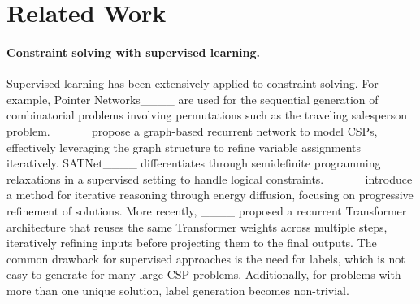 \section{Related Work}
\paragraph{Constraint solving with supervised learning.}
Supervised learning has been extensively applied to constraint solving. For example, Pointer Networks____ are used for the sequential generation of combinatorial problems involving permutations such as the traveling salesperson problem. ____ propose a graph-based recurrent network to model CSPs, effectively leveraging the graph structure to refine variable assignments iteratively. SATNet____ differentiates through semidefinite programming relaxations in a supervised setting to handle logical constraints. ____ introduce a method for iterative reasoning through energy diffusion, focusing on progressive refinement of solutions. More recently, ____ proposed a recurrent Transformer architecture that reuses the same Transformer weights across multiple steps, iteratively refining inputs before projecting them to the final outputs. The common drawback for supervised approaches is the need for labels, which is not easy to generate for many large CSP problems. Additionally, for problems with more than one unique solution, label generation becomes non-trivial. 







